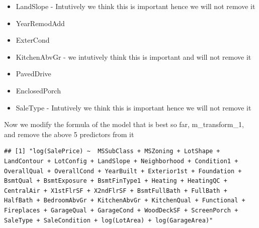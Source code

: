 \documentclass[
]{article}
\newenvironment{Shaded}{\begin{snugshade}}{\end{snugshade}}
\newcommand{\CharTok}[1]{\textcolor[rgb]{0.31,0.60,0.02}{#1}}
\newcommand{\CommentTok}[1]{\textcolor[rgb]{0.56,0.35,0.01}{\textit{#1}}}
\newcommand{\DataTypeTok}[1]{\textcolor[rgb]{0.13,0.29,0.53}{#1}}
\newcommand{\DecValTok}[1]{\textcolor[rgb]{0.00,0.00,0.81}{#1}}
\newcommand{\KeywordTok}[1]{\textcolor[rgb]{0.13,0.29,0.53}{\textbf{#1}}}
\newcommand{\NormalTok}[1]{#1}
\newcommand{\OperatorTok}[1]{\textcolor[rgb]{0.81,0.36,0.00}{\textbf{#1}}}
\newcommand{\StringTok}[1]{\textcolor[rgb]{0.31,0.60,0.02}{#1}}
\providecommand{\tightlist}{%
  \setlength{\itemsep}{0pt}\setlength{\parskip}{0pt}}
\begin{document}
\begin{itemize}
\tightlist
\item
  LandSlope - Intutively we think this is important hence we will not remove it
\item
  YearRemodAdd
\item
  ExterCond
\item
  KitchenAbvGr - we intutively think this is important and will not remove it
\item
  PavedDrive
\item
  EnclosedPorch
\item
  SaleType - Intutively we think this is important hence we will not remove it
\end{itemize}

Now we modify the formula of the model that is best so far, m\_transform\_1, and remove the above 5 predictors from it

\begin{Shaded}
\end{Shaded}

\begin{verbatim}
## [1] "log(SalePrice) ~  MSSubClass + MSZoning + LotShape + LandContour + LotConfig + LandSlope + Neighborhood + Condition1 + OverallQual + OverallCond + YearBuilt + Exterior1st + Foundation + BsmtQual + BsmtExposure + BsmtFinType1 + Heating + HeatingQC + CentralAir + X1stFlrSF + X2ndFlrSF + BsmtFullBath + FullBath + HalfBath + BedroomAbvGr + KitchenAbvGr + KitchenQual + Functional + Fireplaces + GarageQual + GarageCond + WoodDeckSF + ScreenPorch + SaleType + SaleCondition + log(LotArea) + log(GarageArea)"
\end{verbatim}
\end{document}

